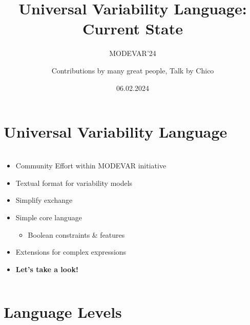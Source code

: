 \documentclass[
	aspectratio=169, %
	8pt, %
	nosectionframes, %
]{beamer}
\title[UVL: Current State]{Universal Variability Language: Current State} %
\subtitle[MODEVAR'24]{MODEVAR'24} %
\author[Chico Sundermann]{Contributions by many great people, Talk by Chico} %
\date{06.02.2024} %
\begin{document}

\section{Universal Variability Language}

\begin{frame}
	\frametitle{\insertsection}
	\begin{columns}
		\begin{column}{0.49\textwidth}
			\begin{itemize}
				\item Community Effort within MODEVAR initiative
				\item Textual format for variability models
				\item Simplify exchange
				\item<2-> Simple core language
                \begin{itemize}
                    \item Boolean constraints \& features
                \end{itemize}
                \item<2-> Extensions for complex expressions
                \item<3-> \textbf{Let's take a look!}
			\end{itemize}
		\end{column}

		\begin{column}{0.49\textwidth}
		\end{column}
	\end{columns}
\end{frame}

\section{Language Levels}
\end{document}
